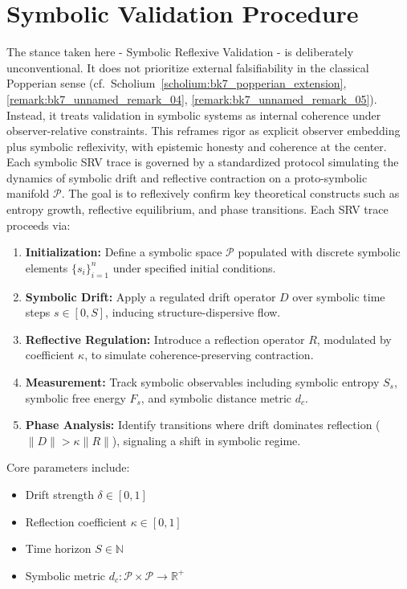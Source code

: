 \section*{Symbolic Validation Procedure}
\label{sec:appB_symbolic_validation_procedure}
The stance taken here - Symbolic Reflexive Validation - is deliberately
unconventional. It does not prioritize external falsifiability in the classical
Popperian sense (cf.~Scholium~\ref{scholium:bk7_popperian_extension},
\ref{remark:bk7_unnamed_remark_04}, \ref{remark:bk7_unnamed_remark_05}).
Instead, it treats validation in symbolic systems as internal coherence under
observer-relative constraints. This reframes rigor as explicit observer
embedding plus symbolic reflexivity, with epistemic honesty and coherence at
the center.
Each symbolic SRV trace is governed by a standardized protocol simulating the dynamics of symbolic drift and reflective contraction on a proto-symbolic manifold \( \mathcal{P} \). The goal is to reflexively confirm key theoretical constructs such as entropy growth, reflective equilibrium, and phase transitions.
\vspace{0.5em}
\noindent Each SRV trace proceeds via:
\begin{enumerate}
    \item \textbf{Initialization:} Define a symbolic space \( \mathcal{P} \) populated with discrete symbolic elements \( \{s_i\}_{i=1}^n \) under specified initial conditions.
    \item \textbf{Symbolic Drift:} Apply a regulated drift operator \( D \) over symbolic time steps \( s \in [0, S] \), inducing structure-dispersive flow.
    \item \textbf{Reflective Regulation:} Introduce a reflection operator \( R \), modulated by coefficient \( \kappa \), to simulate coherence-preserving contraction.
    \item \textbf{Measurement:} Track symbolic observables including symbolic entropy \( S_s \), symbolic free energy \( F_s \), and symbolic distance metric \( d_c \).
    \item \textbf{Phase Analysis:} Identify transitions where drift dominates reflection (\( \|D\| > \kappa \|R\| \)), signaling a shift in symbolic regime.
\end{enumerate}
\vspace{0.5em}
\noindent Core parameters include:
\begin{itemize}
    \item Drift strength \( \delta \in [0, 1] \)
    \item Reflection coefficient \( \kappa \in [0, 1] \)
    \item Time horizon \( S \in \mathbb{N} \)
    \item Symbolic metric \( d_c: \mathcal{P} \times \mathcal{P} \rightarrow \mathbb{R}^+ \)
\end{itemize}

